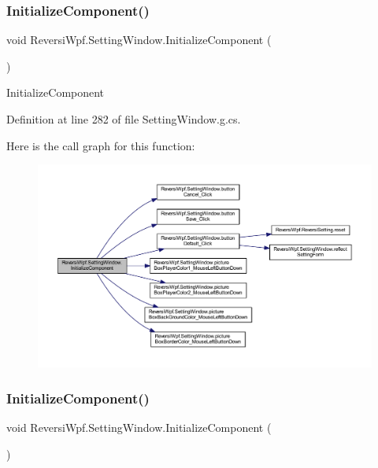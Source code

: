 \subsubsection{\texorpdfstring{Initialize\+Component()}{InitializeComponent()}\hspace{0.1cm}{\footnotesize\ttfamily [3/4]}}
{\footnotesize\ttfamily void Reversi\+Wpf.\+Setting\+Window.\+Initialize\+Component (\begin{DoxyParamCaption}{ }\end{DoxyParamCaption})}



Initialize\+Component 



Definition at line 282 of file Setting\+Window.\+g.\+cs.

Here is the call graph for this function\+:
\nopagebreak
\begin{figure}[H]
\begin{center}
\leavevmode
\includegraphics[width=350pt]{class_reversi_wpf_1_1_setting_window_a34db1776e5f52338539888d97f317a5a_cgraph}
\end{center}
\end{figure}
\mbox{\label{class_reversi_wpf_1_1_setting_window_a34db1776e5f52338539888d97f317a5a}} 
\subsubsection{\texorpdfstring{Initialize\+Component()}{InitializeComponent()}\hspace{0.1cm}{\footnotesize\ttfamily [4/4]}}
{\footnotesize\ttfamily void Reversi\+Wpf.\+Setting\+Window.\+Initialize\+Component (\begin{DoxyParamCaption}{ }\end{DoxyParamCaption})}



